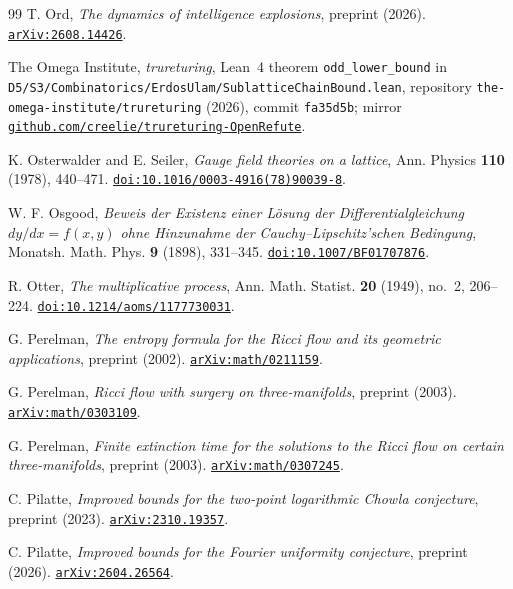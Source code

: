 \begin{thebibliography}{99}
T. Ord,
\emph{The dynamics of intelligence explosions},
preprint (2026).
\href{https://arxiv.org/abs/2608.14426}{\nolinkurl{arXiv:2608.14426}}.

The Omega Institute,
\emph{trureturing}, Lean~4 theorem \texttt{odd\_lower\_bound} in \nolinkurl{D5/S3/Combinatorics/ErdosUlam/SublatticeChainBound.lean}, repository \nolinkurl{the-omega-institute/trureturing} (2026), commit \texttt{fa35d5b};
mirror \href{https://github.com/creelie/trureturing-OpenRefute}{\nolinkurl{github.com/creelie/trureturing-OpenRefute}}.

K. Osterwalder and E. Seiler,
\emph{Gauge field theories on a lattice},
Ann. Physics \textbf{110} (1978), 440--471.
\href{https://doi.org/10.1016/0003-4916(78)90039-8}{\nolinkurl{doi:10.1016/0003-4916(78)90039-8}}.

W. F. Osgood,
\emph{Beweis der Existenz einer L\"osung der Differentialgleichung $dy/dx=f(x,y)$ ohne Hinzunahme der Cauchy--Lipschitz'schen Bedingung},
Monatsh. Math. Phys. \textbf{9} (1898), 331--345.
\href{https://doi.org/10.1007/BF01707876}{\nolinkurl{doi:10.1007/BF01707876}}.

R. Otter,
\emph{The multiplicative process},
Ann. Math. Statist. \textbf{20} (1949), no.~2, 206--224.
\href{https://doi.org/10.1214/aoms/1177730031}{\nolinkurl{doi:10.1214/aoms/1177730031}}.

G. Perelman,
\emph{The entropy formula for the Ricci flow and its geometric applications},
preprint (2002).
\href{https://arxiv.org/abs/math/0211159}{\nolinkurl{arXiv:math/0211159}}.

G. Perelman,
\emph{Ricci flow with surgery on three-manifolds},
preprint (2003).
\href{https://arxiv.org/abs/math/0303109}{\nolinkurl{arXiv:math/0303109}}.

G. Perelman,
\emph{Finite extinction time for the solutions to the Ricci flow on certain three-manifolds},
preprint (2003).
\href{https://arxiv.org/abs/math/0307245}{\nolinkurl{arXiv:math/0307245}}.

C. Pilatte,
\emph{Improved bounds for the two-point logarithmic Chowla conjecture},
preprint (2023).
\href{https://arxiv.org/abs/2310.19357}{\nolinkurl{arXiv:2310.19357}}.

C. Pilatte,
\emph{Improved bounds for the Fourier uniformity conjecture},
preprint (2026).
\href{https://arxiv.org/abs/2604.26564}{\nolinkurl{arXiv:2604.26564}}.


\end{thebibliography}
